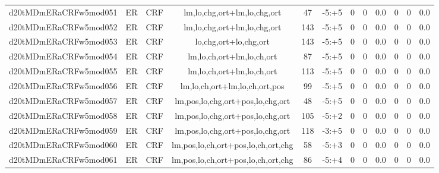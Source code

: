 \documentclass[a4paper]{article}
\begin{document}
\begin{landscape}
\begin{center}
\begin{tabular}{ |c|c|c|c|c|c|c|c|c|c|c|c|}
 
 	
 	\small{ d20tMDmERaCRFw5mod051 } & ER & CRF & lm,lo,chg,ort+lm,lo,chg,ort  &  47 &  -5:+5  &  0 & 0 & 0.0  &  0 & 0 & 0.0 \\
 	

 
 	
 	\small{ d20tMDmERaCRFw5mod052 } & ER & CRF & lm,lo,chg,ort+lm,lo,chg,ort  &  143 &  -5:+5  &  0 & 0 & 0.0  &  0 & 0 & 0.0 \\
 	

 
 	
 	\small{ d20tMDmERaCRFw5mod053 } & ER & CRF & lo,chg,ort+lo,chg,ort  &  143 &  -5:+5  &  0 & 0 & 0.0  &  0 & 0 & 0.0 \\
 	

 
 	
 	\small{ d20tMDmERaCRFw5mod054 } & ER & CRF & lm,lo,ch,ort+lm,lo,ch,ort  &  87 &  -5:+5  &  0 & 0 & 0.0  &  0 & 0 & 0.0 \\
 	

 
 	
 	\small{ d20tMDmERaCRFw5mod055 } & ER & CRF & lm,lo,ch,ort+lm,lo,ch,ort  &  113 &  -5:+5  &  0 & 0 & 0.0  &  0 & 0 & 0.0 \\
 	

 
 	
 	\small{ d20tMDmERaCRFw5mod056 } & ER & CRF & lm,lo,ch,ort+lm,lo,ch,ort,pos  &  99 &  -5:+5  &  0 & 0 & 0.0  &  0 & 0 & 0.0 \\
 	

 
 	
 	\small{ d20tMDmERaCRFw5mod057 } & ER & CRF & lm,pos,lo,chg,ort+pos,lo,chg,ort  &  48 &  -5:+5  &  0 & 0 & 0.0  &  0 & 0 & 0.0 \\
 	

 
 	
 	\small{ d20tMDmERaCRFw5mod058 } & ER & CRF & lm,pos,lo,chg,ort+pos,lo,chg,ort  &  105 &  -5:+2  &  0 & 0 & 0.0  &  0 & 0 & 0.0 \\
 	

 
 	
 	\small{ d20tMDmERaCRFw5mod059 } & ER & CRF & lm,pos,lo,chg,ort+pos,lo,chg,ort  &  118 &  -3:+5  &  0 & 0 & 0.0  &  0 & 0 & 0.0 \\
 	

 
 	
 	\small{ d20tMDmERaCRFw5mod060 } & ER & CRF & lm,pos,lo,ch,ort+pos,lo,ch,ort,chg  &  58 &  -5:+3  &  0 & 0 & 0.0  &  0 & 0 & 0.0 \\
 	

 
 	
 	\small{ d20tMDmERaCRFw5mod061 } & ER & CRF & lm,pos,lo,ch,ort+pos,lo,ch,ort,chg  &  86 &  -5:+4  &  0 & 0 & 0.0  &  0 & 0 & 0.0 \\
 	


\end{tabular}
\end{center}
\end{landscape}
\end{document}
